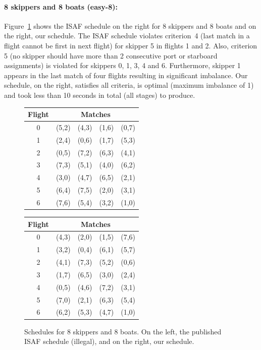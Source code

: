 \documentclass{llncs}
\begin{document}
\paragraph{8 skippers and 8 boats (easy-8):} Figure~\ref{08-08} shows the ISAF schedule on the right
for 8 skippers and 8 boats and on the right, our schedule.  The ISAF schedule violates criterion~4
(last match in a flight cannot be first in next flight) for skipper 5 in flights 1 and 2. Also,
criterion 5 (no skipper should have more than 2 consecutive port or starboard assignments) is
violated for skippers 0, 1, 3, 4 and 6. Furthermore, skipper 1 appears in the last match of four
flights resulting in significant imbalance. Our schedule, on the right, satisfies all criteria, is
optimal (maximum imbalance of 1) and took less than 10 seconds in total (all stages) to produce.

\begin{figure}[h]
\begin{minipage}[t]{0.48\textwidth}
    \centering
\begin{tabular}{ccccc}
        \toprule
        Flight & \multicolumn{4}{c}{Matches} \\ \midrule
0 & (5,2) & (4,3) & (1,6) & (0,7) \\
1 & (2,4) & (0,6) & (1,7) & (5,3) \\
2 & (0,5) & (7,2) & (6,3) & (4,1) \\
3 & (7,3) & (5,1) & (4,0) & (6,2) \\
4 & (3,0) & (4,7) & (6,5) & (2,1) \\
5 & (6,4) & (7,5) & (2,0) & (3,1) \\
6 & (7,6) & (5,4) & (3,2) & (1,0) \\ \bottomrule
    \end{tabular}
\label{08-08a}
\end{minipage}
\hfill
\begin{minipage}[t]{0.48\textwidth}
    \centering
\begin{tabular}{ccccc}
        \toprule
        Flight & \multicolumn{4}{c}{Matches} \\ \midrule
0 & (4,3) & (2,0) & (1,5) & (7,6) \\
1 & (3,2) & (0,4) & (6,1) & (5,7) \\ 
2 & (4,1) & (7,3) & (5,2) & (0,6) \\
3 & (1,7) & (6,5) & (3,0) & (2,4) \\ 
4 & (0,5) & (4,6) & (7,2) & (3,1) \\
5 & (7,0) & (2,1) & (6,3) & (5,4) \\ 
6 & (6,2) & (5,3) & (4,7) & (1,0) \\ \bottomrule
    \end{tabular}
\label{08-08b}
\end{minipage}
\caption{Schedules for 8 skippers and 8 boats. On the left, the published ISAF schedule (illegal),
and on the right, our schedule.}
\label{08-08}
\end{figure}
\end{document}
